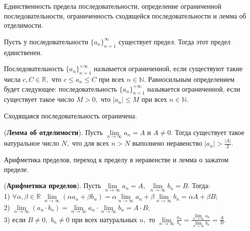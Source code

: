 \newpage
\begin{problem}
Единственность предела последовательности, определение ограниченной последовательности, ограниченность сходящейся последовательности и лемма об отделимости.
\end{problem}

\begin{lemma}
	Пусть у последовательности $\{a_n\}_{n=1}^{\infty}$
	существует предел. Тогда этот предел единственен.
\end{lemma}


\begin{definition}
	Последовательность $\{a_n\}_{n=1}^{+\infty}$
	называется ограниченной, если существуют
	такие числа $c, C\in\mathbb{R},$ что
	$c\leq a_n\leq C$ при всех $n\in\mathbb{N}.$
	Равносильным определением будет следующее:
	последовательность $\{a_n\}_{n=1}^{+\infty}$
	называется ограниченной, если существует
	такое число $M>0,$ что
	$|a_n|\leq M$ при всех $n\in\mathbb{N}.$
\end{definition}
\begin{lemma}
	Сходящаяся последовательность ограничена.
\end{lemma}

\begin{lemma}
	(\textbf{Лемма об отделимости}).
	Пусть $\lim\limits_{n\rightarrow\infty}a_n=A$
	и $A\neq0.$ Тогда существует такое
	натуральное число $N,$ что для всех
	$n>N$ выполнено неравенство
	$|a_n|>\frac{|A|}{2}.$
\end{lemma}

\newpage
\begin{problem}
Арифметика пределов, переход к пределу в неравенстве и лемма о зажатом пределе.
\end{problem}

\begin{theorem}(\textbf{Арифметика пределов}).
	Пусть $\lim\limits_{n\rightarrow\infty}a_n=A,$
	$\lim\limits_{n\rightarrow\infty}b_n=B.$ Тогда:\\
	1) $\forall\alpha, \beta\in\mathbb{R}\;\lim\limits_{n\rightarrow\infty}(\alpha a_n
		+\beta b_n)=\alpha\lim\limits_{n\rightarrow\infty}
		a_n+\beta\lim\limits_{n\rightarrow\infty}b_n=
		\alpha A+\beta B;$\\
	2) $\lim\limits_{n\rightarrow\infty}(a_n
		\cdot b_n)=\lim\limits_{n\rightarrow\infty}
		a_n\cdot \lim\limits_{n\rightarrow\infty}b_n=
		A\cdot B;$\\
	3) если $B\neq0,$ $b_n\neq0$ при всех
	натуральных $n,$ то
	$\lim\limits_{n\rightarrow\infty}\frac{a_n}{b_n}
		=\frac{\lim\limits_{n\rightarrow\infty}
			a_n}{\lim\limits_{n\rightarrow\infty}b_n}=
		\frac{A}{B}.$
\end{theorem}

